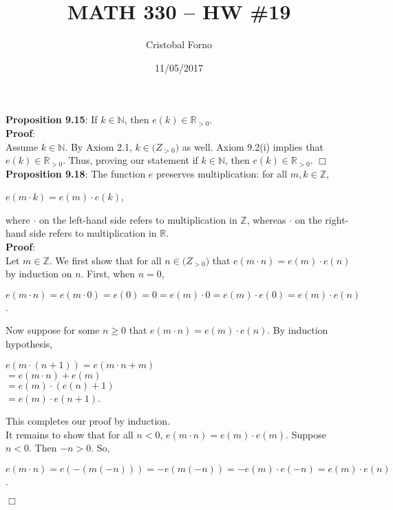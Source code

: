 \documentclass[12pt]{article}
\title{MATH 330 -- HW \#19}
\author{Cristobal Forno}
\date{11/05/2017}
\begin{document}
\maketitle

\noindent
\textbf{Proposition 9.15}: If $k \in \mathbb{N}$, then $e(k) \in
\mathbb{R}_{>0}$.\\

\noindent
\textbf{Proof}:\\
Assume $k \in \mathbb{N}$. By Axiom 2.1, $k \in \mathbb(Z_{>0})$ as well. Axiom
9.2(i) implies that $e(k) \in \mathbb{R}_{>0}$. Thus, proving our statement if $k \in \mathbb{N}$, then $e(k) \in
\mathbb{R}_{>0}$. $\Box$\\

\noindent
\textbf{Proposition 9.18}: The function $e$ preserves multiplication: for all
$m, k \in \mathbb{Z}$,
\begin{center}
  $e(m \cdot k) = e(m) \cdot e(k)$, 
\end{center}
where $\cdot$ on the left-hand side refers to multiplication in $\mathbb{Z}$,
whereas $\cdot$ on the right-hand side refers to multiplication in $\mathbb{R}$.\\
\noindent
\textbf{Proof}:\\
Let $m \in \mathbb{Z}$. We first show that for all $n \in \mathbb(Z_{>0})$ that
$e(m \cdot n) = e(m) \cdot e(n)$ by induction on $n$. First, when $n=0$,
\begin{center}
  $e(m \cdot n) = e(m \cdot 0) = e(0) = 0 = e(m) \cdot 0 = e(m) \cdot e(0) =
  e(m) \cdot e(n)$.
\end{center}
Now suppose for some $n \geq 0$ that $e(m \cdot n) = e(m) \cdot e(n)$. By induction hypothesis,
\begin{center}
  $e(m \cdot (n+1)) = e(m \cdot n + m)$ \\ $= e(m \cdot n) + e(m)$ \\ $= e(m)
  \cdot (e(n) + 1)$ \\ $= e(m) \cdot e(n + 1)$.
\end{center}
\noindent
This completes our proof by induction.\\
It remains to show that for all $n < 0$, $e(m \cdot n) = e(m) \cdot e(m)$.
Suppose $n < 0$. Then $-n > 0$. So,
\begin{center}
  $e(m \cdot n) = e(-(m(-n))) = -e(m(-n)) = -e(m) \cdot e(-n) = e(m) \cdot e(n)$.
\end{center}
$\Box$
\end{document}
